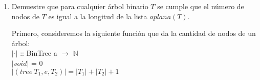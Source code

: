\documentclass{article}
\begin{document}
\begin{enumerate}
{\begin{enumerate}
{                    Usando la definición de lista de objetos que está en las notas, 
                    podemos definir $aplana$ como:
                    
                    $aplana$ :: BinTree a $\rightarrow$ [a]\\
					$aplana$ ($void$) = []\\
                    $aplana$ $(tree \ T_1, e, T_2)$ = 
                    $(aplana \ T_1) ++ (e:(aplana \ T_2))$

                    Donde $++$ es el operador de concatenación en listas.
                }
                \item {
                    Demuestre que para cualquier árbol binario $T$ se cumple que
                    el número de nodos de $T$ es igual a la longitud de la lista 
                    $aplana(T)$.
                    
                    Primero, consideremos la siguiente función que da la cantidad
                    de nodos de un árbol:\\ 
                    $|\cdot|$ :: BinTree a $\rightarrow$ $\mathbb{N}$\\
					$|void|$ = 0\\
					$|(tree \ T_1, e, T_2)| = |T_1| + |T_2| + 1$
                    
}
\end{enumerate}}
\end{enumerate}
\end{document}
